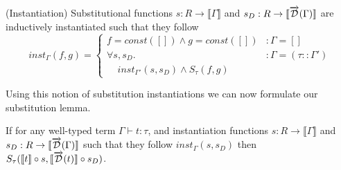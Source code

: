 \documentclass[11pt, final]{article}
\begin{document}
  \begin{definition}(Instantiation)
    Substitutional functions $s : R \rightarrow \llbracket \Gamma \rrbracket$ and $s_D : R \rightarrow \llbracket \overrightarrow{\mathcal{D}}(\Gamma) \rrbracket$ are inductively instantiated such that they follow
    \begin{equation}
      inst_\Gamma(f, g) =
        \left\{
          \begin{array}{ll}
            f = const([]) \wedge g = const([])
              & : \Gamma = [] \\
            \forall s, s_D.
              & : \Gamma = (\tau :: \Gamma') \\
              \;\;\;\;inst_{\Gamma'}(s, s_D) \wedge S_\tau(f, g)
          \end{array}
        \right.
    \label{eqn:lr_base}
    \end{equation}
  \end{definition}

  Using this notion of substitution instantiations we can now formulate our substitution lemma.

  \begin{lemma}[Substitution]\label{thm:substitution_lemma}
    If for any well-typed term $\Gamma \vdash t : \tau$, and instantiation functions $s : R \rightarrow \llbracket \Gamma \rrbracket$ and $s_D : R \rightarrow \llbracket \overrightarrow{\mathcal{D}}(\Gamma) \rrbracket$ such that they follow $inst_\Gamma(s, s_D)$ then $S_\tau(\llbracket t\rrbracket \circ s, \llbracket \overrightarrow{\mathcal{D}}(t)\rrbracket \circ s_D)$.
  \end{lemma}
\end{document}
